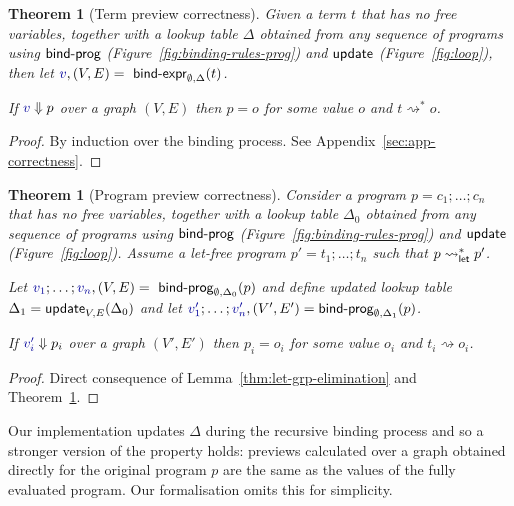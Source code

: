 \documentclass[english,crc]{programming}
\newcounter{thc}
\theoremstyle{plain}
\newtheorem{theorem}[thc]{Theorem}
\theoremstyle{definition}
\newcommand{\ident}[1]{\textnormal{\textcolor{idclr}{\sffamily #1}}}
\newcommand{\bndclr}[1]{\textcolor{kvdclr}{#1}}
\begin{document}
\begin{theorem}[Term preview correctness]
\label{thm:let-free-correct}
Given a term $t$ that has no free variables, together with a lookup table $\Delta$ obtained
from any sequence of programs using $\ident{bind-prog}$ (Figure~\ref{fig:binding-rules-prog}) and
$\ident{update}$ (Figure~\ref{fig:loop}), then
let $\bndclr{v}, (V, E) = \ident{bind-expr}_{\emptyset, \Delta}(t)$.

\vspace{0.25em}
\noindent
If $\bndclr{v}\Downarrow p$
over a graph $(V, E)$ then $p = o$ for some value $o$ and $t \rightsquigarrow^{*} o$.
\end{theorem}

\begin{proof}
By induction over the binding process. See Appendix~\ref{sec:app-correctness}.
\end{proof}

\begin{theorem}[Program preview correctness]
\label{thm:correcntess}
Consider a program $p=c_1;\ldots;c_n$ that has no free variables, together with a lookup table
$\Delta_0$ obtained from any sequence of programs using $\ident{bind-prog}$
(Figure~\ref{fig:binding-rules-prog}) and $\ident{update}$ (Figure~\ref{fig:loop}). Assume a
let-free program $p'=t_1;\ldots;t_n$ such that $p\rightsquigarrow^{*}_\ident{let}p'$.

\vspace{0.25em}
\noindent
Let $\bndclr{v_1};\ldots;\bndclr{v_n}, (V, E) = \ident{bind-prog}_{\emptyset, \Delta_0}(p)$
and define updated lookup table $\Delta_1=\ident{update}_{V, E}(\Delta_0)$ and
let $\bndclr{v'_1};\ldots;\bndclr{v'_n}, (V', E') = \ident{bind-prog}_{\emptyset, \Delta_1}(p)$.

\vspace{0.25em}
\noindent
If $\bndclr{v'_i}\Downarrow p_i$ over a graph $(V', E')$ then $p_i=o_i$ for some value $o_i$ and
$t_i \rightsquigarrow o_i$.
\end{theorem}
\begin{proof}
Direct consequence of Lemma~\ref{thm:let-grp-elimination} and Theorem~\ref{thm:let-free-correct}.
\end{proof}

\noindent
Our implementation updates $\Delta$ during the recursive binding process and so a stronger version
of the property holds: previews calculated over a graph obtained directly for the original program
$p$ are the same as the values of the fully evaluated program. Our formalisation omits this for
simplicity.
\end{document}
